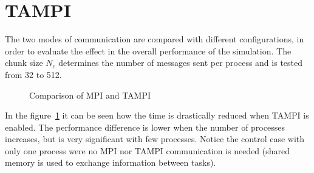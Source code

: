 \section{TAMPI}

The two modes of communication are compared with different configurations, in 
order to evaluate the effect in the overall performance of the simulation. The 
chunk size $N_c$ determines the number of messages sent per process and is 
tested from 32 to 512.
%
\begin{figure}%
\centering
{}
\caption{Comparison of MPI and TAMPI}
\label{fig:TAMPI}
\end{figure}%
%
In the figure~\ref{fig:TAMPI} it can be seen how the time is drastically reduced 
when TAMPI is enabled. The performance difference is lower when the number of 
processes increases, but is very significant with few processes. Notice the 
control case with only one process were no MPI nor TAMPI communication is needed 
(shared memory is used to exchange information between tasks).


